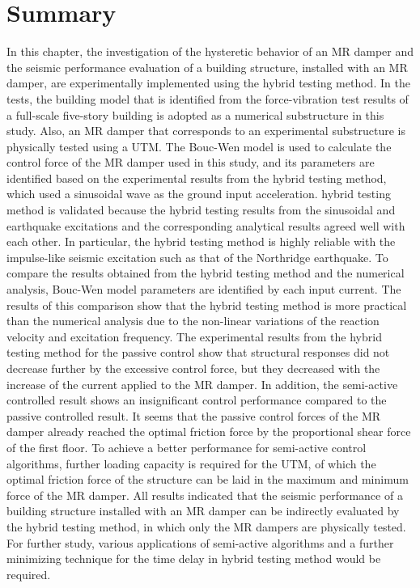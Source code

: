 \section{Summary}
In this chapter, the investigation of the hysteretic behavior of an MR damper and the seismic performance evaluation of a building structure, installed with an MR damper, are experimentally implemented using the hybrid testing method. In the tests, the building model that is identified from the force-vibration test results of a full-scale five-story building is adopted as a numerical substructure in this study. Also, an MR damper that corresponds to an experimental substructure is physically tested using a UTM. The Bouc-Wen model is used to calculate the control force of the MR damper used in this study, and its parameters are identified based on the experimental results from the hybrid testing method, which used a sinusoidal wave as the ground input acceleration. hybrid testing method is validated because the hybrid testing results from the sinusoidal and earthquake excitations and the corresponding analytical results agreed well with each other. In particular, the hybrid testing method is highly reliable with the impulse-like seismic excitation such as that of the Northridge earthquake. To compare the results obtained from the hybrid testing method and the numerical analysis, Bouc-Wen model parameters are identified by each input current. The results of this comparison show that the hybrid testing method is more practical than the numerical analysis due to the non-linear variations of the reaction velocity and excitation frequency. The experimental results from the hybrid testing method for the passive control show that structural responses did not decrease further by the excessive control force, but they decreased with the increase of the current applied to the MR damper. In addition, the semi-active controlled result shows an insignificant control performance compared to the passive controlled result. It seems that the passive control forces of the MR damper already reached the optimal friction force by the proportional shear force of the first floor. To achieve a better performance for semi-active control algorithms, further loading capacity is required for the UTM, of which the optimal friction force of the structure can be laid in the maximum and minimum force of the MR damper. All results indicated that the seismic performance of a building structure installed with an MR damper can be indirectly evaluated by the hybrid testing method, in which only the MR dampers are physically tested. For further study, various applications of semi-active algorithms and a further minimizing technique for the time delay in hybrid testing method would be required.
